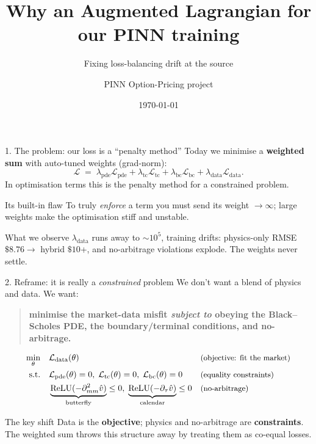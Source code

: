 \documentclass[aspectratio=169,11pt]{beamer}
\title[Augmented Lagrangian for PINNs]{Why an Augmented Lagrangian for our PINN training}
\subtitle{Fixing loss-balancing drift at the source}
\author{PINN Option-Pricing project}
\date{\today}
\newcommand{\Ldata}{\mathcal{L}_{\text{data}}}
\newcommand{\vhat}{\hat{v}}
\begin{document}
\begin{frame}
  \titlepage
\end{frame}

\begin{frame}{1. The problem: our loss is a ``penalty method''}
  Today we minimise a \textbf{weighted sum} with auto-tuned weights (grad-norm):
  \[
    \mathcal{L} \;=\; \lambda_{\text{pde}}\mathcal{L}_{\text{pde}}
      + \lambda_{\text{tc}}\mathcal{L}_{\text{tc}}
      + \lambda_{\text{bc}}\mathcal{L}_{\text{bc}}
      + \lambda_{\text{data}}\Ldata .
  \]
  In optimisation terms this is the \alert{penalty method} for a constrained problem.

  \begin{block}{Its built-in flaw}
    To truly \emph{enforce} a term you must send its weight $\to\infty$; large
    weights make the optimisation stiff and unstable.
  \end{block}

  \begin{exampleblock}{What we observe}
    $\lambda_{\text{data}}$ runs away to ${\sim}10^{5}$, training drifts:
    physics-only RMSE $\$8.76 \rightarrow$ hybrid $\$10$+, and no-arbitrage
    violations explode. The weights never settle.
  \end{exampleblock}
\end{frame}

\begin{frame}{2. Reframe: it is really a \emph{constrained} problem}
  We don't want a blend of physics and data. We want:
  \begin{quote}
    \textbf{minimise the market-data misfit \emph{subject to} obeying the
    Black--Scholes PDE, the boundary/terminal conditions, and no-arbitrage.}
  \end{quote}
  \[
  \begin{aligned}
    \min_{\theta}\quad & \Ldata(\theta) &&\text{\small(objective: fit the market)}\\
    \text{s.t.}\quad
      & \mathcal{L}_{\text{pde}}(\theta)=0,\;
        \mathcal{L}_{\text{tc}}(\theta)=0,\;
        \mathcal{L}_{\text{bc}}(\theta)=0 &&\text{\small(equality constraints)}\\
      & \underbrace{\mathrm{ReLU}(-\partial^2_{mm}\vhat)}_{\text{butterfly}}\le 0,\;
        \underbrace{\mathrm{ReLU}(-\partial_{\tau}\vhat)}_{\text{calendar}}\le 0
        &&\text{\small(no-arbitrage)}
  \end{aligned}
  \]
  \begin{block}{The key shift}
    Data is the \textbf{objective}; physics and no-arbitrage are \textbf{constraints}.
    The weighted sum throws this structure away by treating them as co-equal losses.
  \end{block}
\end{frame}
\end{document}
